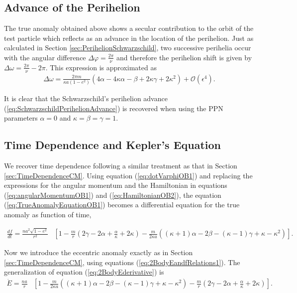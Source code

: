 \subsection{Advance of the Perihelion}

The true anomaly obtained above shows a secular contribution to the orbit of the test particle which reflects as an advance in the location of the perihelion. Just as calculated in Section \ref{sec:PerihelionSchwarzschild}, two successive perihelia occur with the angular difference $\Delta \varphi = \frac{2\pi}{\nu}$ and therefore the perihelion shift is given by $\Delta \omega = \frac{2\pi}{\nu} - 2\pi$. This expression is approximated as
\begin{align}
\Delta \omega =   \frac{2\pi m}{\kappa a (1-e^2)} \left( 4\alpha - 4\kappa \alpha - \beta + 2\kappa \gamma + 2\kappa^2 \right) + \mathcal{O} ( \epsilon ^4 ).
\end{align}

It is clear that the Schwarzschild's perihelion advance (\ref{eq:SchwarzschildPerihelionAdvance}) is recovered when using the PPN parameters $\alpha=0$ and $\kappa = \beta = \gamma = 1$.

\subsection{Time Dependence and Kepler's Equation}
We recover time dependence following a similar treatment as that in Section \ref{sec:TimeDependenceCM}. Using equation (\ref{eq:dotVarphiOB1}) and replacing the expressions for the angular momentum and the Hamiltonian in equations (\ref{eq:angularMomentumOB1}) and (\ref{eq:HamiltonianOB2}), the equation (\ref{eq:TrueAnomalyEquationOB1}) becomes a differential equation for the true anomaly as function of time,
\begin{small}
\begin{align}
\frac{df}{dt} =  \frac{na^2 \sqrt{1-e^2}}{r^2} & \left[ 1 - \frac{m}{r}\left( 2\gamma - 2\alpha + \frac{\alpha}{\kappa} + 2\kappa \right)  - \frac{m}{2\kappa a}\left((\kappa +1) \alpha - 2\beta - (\kappa -1)\gamma + \kappa - \kappa^2 \right) \right].
\end{align}
\end{small}

Now we introduce the eccentric anomaly exactly as in Section \ref{sec:TimeDependenceCM}, using equations (\ref{eq:2BodyEandfRelations1}). The generalization of equation (\ref{eq:2BodyEderivative}) is
\begin{align}
\dot{E} = \frac{na}{r}  & \left[ 1 - \frac{m}{2\kappa a}\left((\kappa +1) \alpha - 2\beta - (\kappa -1)\gamma + \kappa - \kappa^2 \right)- \frac{m}{r}\left( 2\gamma - 2\alpha + \frac{\alpha}{\kappa} + 2\kappa \right) \right].
\end{align}

